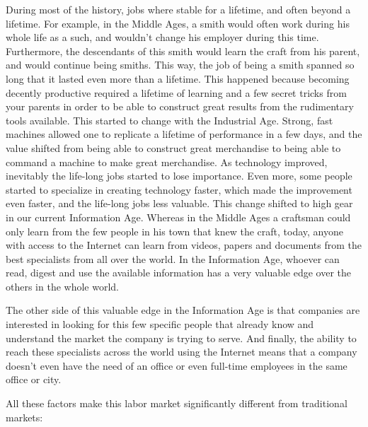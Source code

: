 \documentclass{article}
\begin{document}
During most of the history, jobs where stable for a lifetime, and often beyond a lifetime. For example, in the Middle Ages, a smith would often work during his whole life as a such, and wouldn't change his employer during this time. Furthermore, the descendants of this smith would learn the craft from his parent, and would continue being smiths. This way, the job of being a smith spanned so long that it lasted even more than a lifetime. This happened because becoming decently productive required a lifetime of learning and a few secret tricks from your parents in order to be able to construct great results from the rudimentary tools available. This started to change with the Industrial Age. Strong, fast machines allowed one to replicate a lifetime of performance in a few days, and the value shifted from being able to construct great merchandise to being able to command a machine to make great merchandise. As technology improved, inevitably the life-long jobs started to lose importance. Even more, some people started to specialize in creating technology faster, which made the improvement even faster, and the life-long jobs less valuable. This change shifted to high gear in our current Information Age. Whereas in the Middle Ages a craftsman could only learn from the few people in his town that knew the craft, today, anyone with access to the Internet can learn from videos, papers and documents from the best specialists from all over the world. In the Information Age, whoever can read, digest and use the available information has a very valuable edge over the others in the whole world.

The other side of this valuable edge in the Information Age is that companies are interested in looking for this few specific people that already know and understand the market the company is trying to serve. And finally, the ability to reach these specialists across the world using the Internet means that a company doesn't even have the need of an office or even full-time employees in the same office or city.

All these factors make this labor market significantly different from traditional markets:
\end{document}
